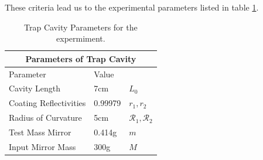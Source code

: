 These criteria lead us to the experimental parameters listed in table
\ref{tab:lintrap1}.





\begin{table}
\begin{center}
\begin{tabular}{|l|l|l|}
  \hline
  \multicolumn{3}{|c|}{Parameters of Trap Cavity} \\
  \hline
  \hline
  Parameter & Value & \\
  \hline
  Cavity Length & 7cm & $L_0$ \\
  Coating Reflectivities & 0.99979 & $r_1,r_2$ \\
  Radius of Curvature & 5cm & $\mathcal{R}_1,\mathcal{R}_2$ \\
  Test Mass Mirror & 0.414g & $m$ \\
  Input Mirror Mass & 300g & $M$ \\
  \hline
\end{tabular}
\end{center}
\caption[Trap Cavity Parameters]{Trap Cavity Parameters for the expermiment.}
\label{tab:lintrap1}
\end{table}


